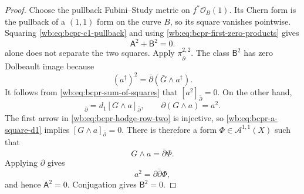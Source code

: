 \begin{proof}
Choose the pullback Fubini--Study metric on
$f^*\mathcal O_B(1)$.  Its Chern form is the pullback of a $(1,1)$ form on
the curve $B$, so its square vanishes pointwise.  Squaring
\cref{wb:eq:bcpr-c1-pullback} and using
\cref{wb:eq:bcpr-first-zero-products} gives
\begin{equation}
 \mathsf A^2+\mathsf B^2=0.
\label{wb:eq:bcpr-sum-of-squares}
\end{equation}
 alone does not separate the two
squares.  Apply $\pi_{\bar\partial}^{2,2}$.  The class
$\mathsf B^2$ has zero Dolbeault image because
\begin{equation}
 (a^\dagger)^2
 =\bar\partial(\bar G\wedge a^\dagger).
\label{wb:eq:bcpr-b-square-dolbeault-zero}
\end{equation}
It follows from \cref{wb:eq:bcpr-sum-of-squares} that
$[a^2]_{\bar\partial}=0$.  On the other hand,
\begin{equation}
 [a^2]_{\bar\partial}
 =d_1[G\wedge a]_{\bar\partial},
 \qquad
 \partial(G\wedge a)=a^2.
\label{wb:eq:bcpr-a-square-d1}
\end{equation}
The first arrow in \cref{wb:eq:bcpr-hodge-row-two} is injective, so
\cref{wb:eq:bcpr-a-square-d1} implies
$[G\wedge a]_{\bar\partial}=0$.  There is therefore a form
$\Phi\in\mathcal A^{1,1}(X)$ such that
\begin{equation}
 G\wedge a=\bar\partial\Phi.
\label{wb:eq:bcpr-phi-primitive}
\end{equation}
Applying $\partial$ gives
\begin{equation}
 a^2=\partial\bar\partial\Phi,
\label{wb:eq:bcpr-a-square-bc-zero}
\end{equation}
and hence $\mathsf A^2=0$.  Conjugation gives
$\mathsf B^2=0$.


\end{proof}
